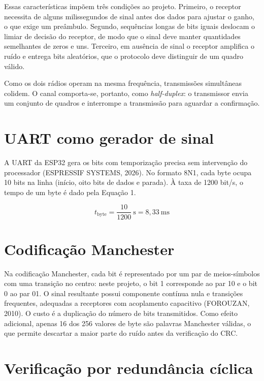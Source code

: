 \documentclass[12pt, oneside, a4paper, sumario=tradicional, chapter=TITLE, brazilian]{abntex2}
\begin{document}
Essas características impõem três condições ao projeto. Primeiro, o receptor necessita de alguns milissegundos de sinal antes dos dados para ajustar o ganho, o que exige um preâmbulo. Segundo, sequências longas de bits iguais deslocam o limiar de decisão do receptor, de modo que o sinal deve manter quantidades semelhantes de zeros e uns. Terceiro, em ausência de sinal o receptor amplifica o ruído e entrega bits aleatórios, que o protocolo deve distinguir de um quadro válido.

Como os dois rádios operam na mesma frequência, transmissões simultâneas colidem. O canal comporta-se, portanto, como \textit{half-duplex}: o transmissor envia um conjunto de quadros e interrompe a transmissão para aguardar a confirmação.

\section{UART como gerador de sinal}

A UART da ESP32 gera os bits com temporização precisa sem intervenção do processador (ESPRESSIF SYSTEMS, 2026). No formato 8N1, cada byte ocupa 10 bits na linha (início, oito bits de dados e parada). À taxa de 1200 bit/s, o tempo de um byte é dado pela Equação 1.

\begin{equation}
  t_{\text{byte}} = \frac{10}{1200}\ \text{s} = 8{,}33\ \text{ms}
\end{equation}

\section{Codificação Manchester}

Na codificação Manchester, cada bit é representado por um par de meios-símbolos com uma transição no centro: neste projeto, o bit 1 corresponde ao par 10 e o bit 0 ao par 01. O sinal resultante possui componente contínua nula e transições frequentes, adequadas a receptores com acoplamento capacitivo (FOROUZAN, 2010). O custo é a duplicação do número de bits transmitidos. Como efeito adicional, apenas 16 dos 256 valores de byte são palavras Manchester válidas, o que permite descartar a maior parte do ruído antes da verificação do CRC.

\section{Verificação por redundância cíclica}
\end{document}

